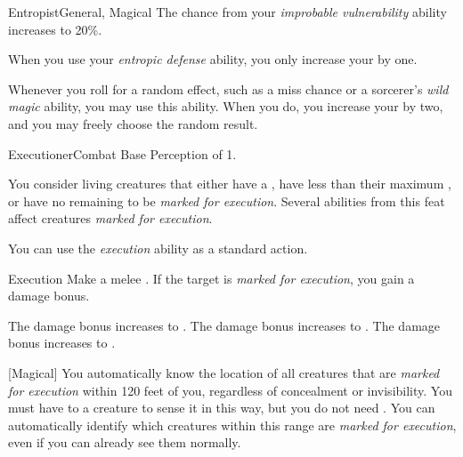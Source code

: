 \begin{feat}{Entropist}{General, Magical}
         The chance from your \textit{improbable vulnerability} ability increases to 20\%.

         When you use your \textit{entropic defense} ability, you only increase your  by one.

         Whenever you roll for a random effect, such as a miss chance or a sorcerer's \textit{wild magic} ability, you may use this ability.
        When you do, you increase your  by two, and you may freely choose the random result.
    \end{feat}

    \begin{feat}{Executioner}{Combat}
        \featpres Base Perception of 1.

         You consider living creatures that either have a , have less than their maximum , or have no remaining  to be \textit{marked for execution}.
        Several abilities from this feat affect creatures \textit{marked for execution}.

         You can use the \textit{execution} ability as a standard action.
        \begin{freeability}{Execution}
            Make a melee .
            If the target is \textit{marked for execution}, you gain a  damage bonus.

            \rankline
             The damage bonus increases to .
             The damage bonus increases to .
             The damage bonus increases to .
        \end{freeability}

        [Magical] You automatically know the location of all creatures that are \textit{marked for execution} within 120 feet of you, regardless of concealment or invisibility.
        You must have  to a creature to sense it in this way, but you do not need .
        You can automatically identify which creatures within this range are \textit{marked for execution}, even if you can already see them normally.


\end{feat}
